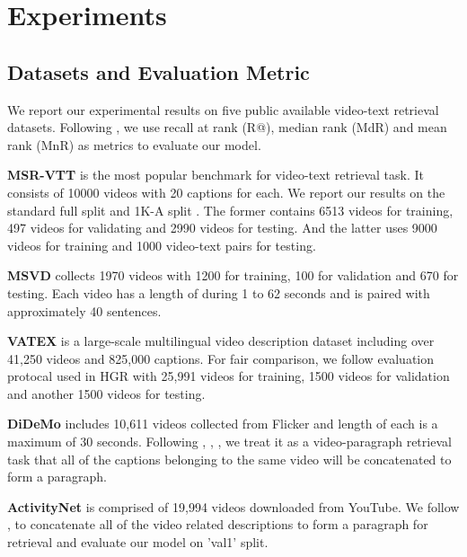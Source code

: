 
\section{Experiments}
\subsection{Datasets and Evaluation Metric}
We report our experimental results on five public available video-text retrieval datasets. Following \cite{luo2021clip4clip}, we use recall at rank  (R@), median rank (MdR) and mean rank (MnR) as metrics to evaluate our model.

\noindent\textbf{MSR-VTT} \cite{xu2016msrvtt} is the most popular benchmark for video-text retrieval task. It consists of 10000 videos with 20 captions for each. We report our results on the standard full split \cite{dzabraev2021mdmmt} and 1K-A split \cite{yu2018joint}. The former contains 6513 videos for training, 497 videos for validating and 2990 videos for testing. And the latter uses 9000 videos for training and 1000 video-text pairs for testing.

\noindent\textbf{MSVD} \cite{chen2011collecting} collects 1970 videos with 1200 for training, 100 for validation and 670 for testing. Each video has a length of during 1 to 62 seconds and is paired with approximately 40 sentences.

\noindent\textbf{VATEX} \cite{wang2019vatex} is a large-scale multilingual video description dataset including over 41,250 videos and 825,000 captions. For fair comparison, we follow evaluation protocal used in HGR \cite{chen2020fine} with 25,991 videos for training, 1500 videos for validation and another 1500 videos for testing.

\noindent\textbf{DiDeMo} \cite{anne2017localizing} includes 10,611 videos collected from Flicker and length of each is a maximum of 30 seconds. Following \cite{liu2019use}, \cite{lei2021less}, \cite{bain2021frozen}, we treat it as a video-paragraph retrieval task that all of the captions belonging to the same video will be concatenated to form a paragraph.

\noindent\textbf{ActivityNet} \cite{krishna2017dense} is comprised of 19,994 videos downloaded from YouTube. We follow \cite{zhang2018cross}, \cite{gabeur2020multi} to concatenate all of the video related descriptions to form a paragraph for retrieval and evaluate our model on 'val1' split.

